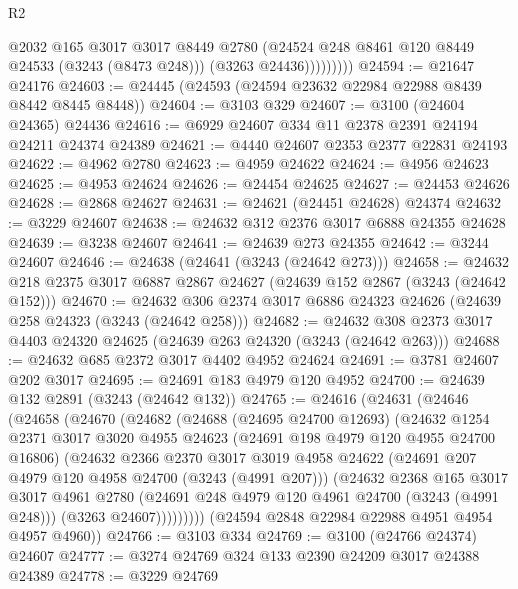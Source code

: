 \begin{lexlean}{R2}
\begin{coremodule}
                    @2032
                    @165
                    @3017
                    @3017
                    @8449
                    @2780
                    (@24524 @248 @8461 @120 @8449 @24533 (@3243 (@8473 @248)))
                    (@3263 @24436)))))))))
@24594 := @21647 @24176
@24603 := @24445 (@24593 (@24594 @23632 @22984 @22988 @8439 @8442 @8445 @8448))
@24604 := @3103 @329
@24607 := @3100 (@24604 @24365) @24436
@24616 := @6929 @24607 @334 @11 @2378 @2391 @24194 @24211 @24374 @24389
@24621 := @4440 @24607 @2353 @2377 @22831 @24193
@24622 := @4962 @2780
@24623 := @4959 @24622
@24624 := @4956 @24623
@24625 := @4953 @24624
@24626 := @24454 @24625
@24627 := @24453 @24626
@24628 := @2868 @24627
@24631 := @24621 (@24451 @24628) @24374
@24632 := @3229 @24607
@24638 := @24632 @312 @2376 @3017 @6888 @24355 @24628
@24639 := @3238 @24607
@24641 := @24639 @273 @24355
@24642 := @3244 @24607
@24646 := @24638 (@24641 (@3243 (@24642 @273)))
@24658 := @24632 @218 @2375 @3017 @6887 @2867 @24627 (@24639 @152 @2867 (@3243 (@24642 @152)))
@24670 := @24632 @306 @2374 @3017 @6886 @24323 @24626 (@24639 @258 @24323 (@3243 (@24642 @258)))
@24682 := @24632 @308 @2373 @3017 @4403 @24320 @24625 (@24639 @263 @24320 (@3243 (@24642 @263)))
@24688 := @24632 @685 @2372 @3017 @4402 @4952 @24624
@24691 := @3781 @24607 @202 @3017
@24695 := @24691 @183 @4979 @120 @4952
@24700 := @24639 @132 @2891 (@3243 (@24642 @132))
@24765 := @24616
    (@24631
      (@24646
        (@24658
          (@24670
            (@24682
              (@24688
                (@24695 @24700 @12693)
                (@24632
                  @1254
                  @2371
                  @3017
                  @3020
                  @4955
                  @24623
                  (@24691 @198 @4979 @120 @4955 @24700 @16806)
                  (@24632
                    @2366
                    @2370
                    @3017
                    @3019
                    @4958
                    @24622
                    (@24691 @207 @4979 @120 @4958 @24700 (@3243 (@4991 @207)))
                    (@24632
                      @2368
                      @165
                      @3017
                      @3017
                      @4961
                      @2780
                      (@24691 @248 @4979 @120 @4961 @24700 (@3243 (@4991 @248)))
                      (@3263 @24607)))))))))
      (@24594 @2848 @22984 @22988 @4951 @4954 @4957 @4960))
@24766 := @3103 @334
@24769 := @3100 (@24766 @24374) @24607
@24777 := @3274 @24769 @324 @133 @2390 @24209 @3017 @24388 @24389
@24778 := @3229 @24769

\end{coremodule}
\end{lexlean}

